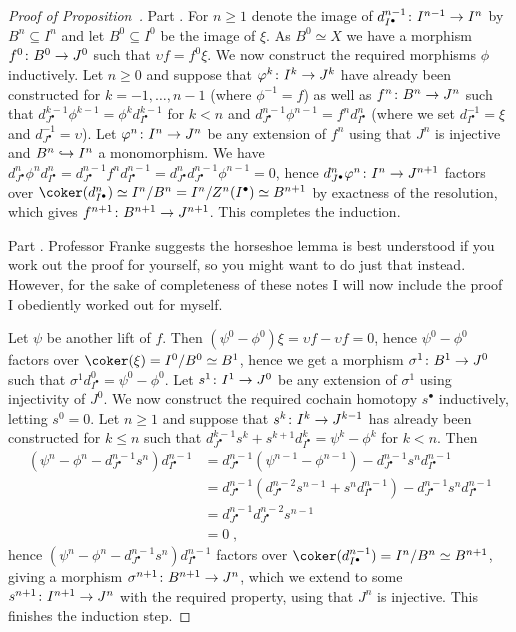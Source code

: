 \documentclass[a4paper,parskip=half,numbers=enddot, DIV=12]{scrreprt}
\begin{document}
\begin{proof}[Proof of Proposition~]
	Part . For $n\geq 1$ denote the image of $d_{I^\bullet }^{n-1}\colon I^{n-1}\morphism I^n$ by $B^n\subseteq I^n$ and let $B^0\subseteq I^0$ be the image of $\xi$. As $B^0\simeq X$ we have a morphism $f^0\colon B^0\morphism J^0$ such that $\upsilon f=f^0\xi$. We now construct the required morphisms $\phi $ inductively. Let $n\geq 0$ and suppose that $\phi^k\colon I^k\morphism J^k$ have already been constructed for $k=-1,\ldots,n-1$ (where $\phi^{-1}=f$) as well as $f^n\colon B^n\morphism J^n$ such that $d_{J^\bullet }^{k-1}\phi^{k-1}=\phi^kd_{I^\bullet }^{k-1}$ for $k< n$ and $d_{J ^\bullet }^{n-1}\phi^{n-1}=f^nd_{I^\bullet }^n$ (where we set $d_{I^\bullet }^{-1}=\xi$ and $d_{J^\bullet }^{-1}=\upsilon$). Let $\phi^n\colon I^n\morphism J^n$ be any extension of $f^n$ using that $J^n$ is injective and $B^n\monomorphism I^n$ a monomorphism. We have $d_{J^\bullet }^{n}\phi ^nd_{I^\bullet }^n=d_{J^\bullet }^{n-1}f^nd_{I^\bullet }^{n-1}=d_{J^\bullet }^nd_{J^\bullet }^{n-1}\phi^{n-1}=0$, hence $d_{J^\bullet }^n\phi^n\colon I^n\morphism J^{n+1}$ factors over $\coker(d_{I^\bullet }^n)\simeq I^n/B^n=I^n/Z^n(I^\bullet )\simeq B^{n+1}$ by exactness of the resolution, which gives $f^{n+1}\colon B^{n+1}\morphism J^{n+1}$. This completes the induction.
	
	Part . Professor Franke suggests the horseshoe lemma is best understood if you work out the proof for yourself, so you might want to do just that instead. However, for the sake of completeness of these notes I will now include the proof I obediently worked out for myself.
	
	Let $\psi $ be another lift of $f$. Then $(\psi^0-\phi^0)\xi=\upsilon f-\upsilon f=0$, hence $\psi^0-\phi^0$ factors over $\coker(\xi)=I^0/B^0\simeq B^1$, hence we get a morphism $\sigma^1\colon B^1\morphism J^0$ such that $\sigma^1d_{I^\bullet }^0=\psi^0-\phi^0$. Let $s^1\colon I^1\morphism J^0$ be any extension of $\sigma^1$ using injectivity of $J^0$. We now construct the required cochain homotopy $s^\bullet $ inductively, letting $s^0=0$. Let $n\geq 1$ and suppose that $s^k\colon I^k\morphism J^{k-1}$ has already been constructed for $k\leq n$ such that $d_{J^\bullet }^{k-1}s^k+s^{k+1}d_{I^\bullet }^k=\psi^k-\phi^k$ for $k<n$. Then
	\begin{align*}
		\left(\psi^n-\phi^n-d_{J^\bullet }^{n-1}s^n\right)d_{I^\bullet }^{n-1}&=d_{J^\bullet }^{n-1}\left(\psi^{n-1}-\phi^{n-1}\right)-d_{J^\bullet }^{n-1}s^nd_{I^\bullet }^{n-1}\\
		&=d_{J^\bullet }^{n-1}\left(d_{J^\bullet }^{n-2}s^{n-1}+s^nd_{I^\bullet }^{n-1}\right)-d_{J^\bullet }^{n-1}s^nd_{I^\bullet }^{n-1}\\
		&=d_{J^\bullet }^{n-1}d_{J^\bullet }^{n-2}s^{n-1}\\
		&=0\;,
	\end{align*}
	hence $(\psi^n-\phi^n-d_{J^\bullet }^{n-1}s^n)d_{I^\bullet }^{n-1}$ factors over $\coker(d_{I^\bullet }^{n-1})=I^n/B^n\simeq B^{n+1}$, giving a morphism $\sigma^{n+1}\colon B^{n+1}\morphism J^n$, which we extend to some $s^{n+1}\colon I^{n+1}\morphism J^n$ with the required property, using that $J^n$ is injective. This finishes the induction step.
	

\end{proof}
\end{document}

